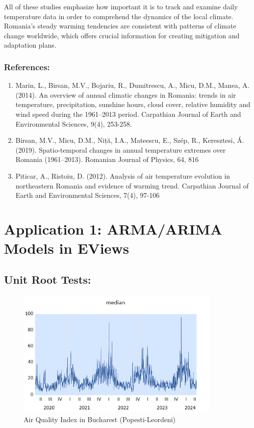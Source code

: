 \documentclass{article} %
\begin{document}
All of these studies emphasize how important it is to track and examine daily temperature data in order to comprehend the dynamics of the local climate. Romania's steady warming tendencies are consistent with patterns of climate change worldwide, which offers crucial information for creating mitigation and adaptation plans.

\subsubsection*{References:}
\begin{enumerate}
    \item Marin, L., Birsan, M.V., Bojariu, R., Dumitrescu, A., Micu, D.M., Manea, A. (2014). An overview of annual climatic changes in Romania: trends in air temperature, precipitation, sunshine hours, cloud cover, relative humidity and wind speed during the 1961–2013 period. Carpathian Journal of Earth and Environmental Sciences, 9(4), 253-258.
    \item Birsan, M.V., Micu, D.M., Niță, I.A., Mateescu, E., Szép, R., Keresztesi, Á. (2019). Spatio-temporal changes in annual temperature extremes over Romania (1961–2013). Romanian Journal of Physics, 64, 816
    \item Piticar, A., Ristoiu, D. (2012). Analysis of air temperature evolution in northeastern Romania and evidence of warming trend. Carpathian Journal of Earth and Environmental Sciences, 7(4), 97-106
\end{enumerate}

\section{Application 1: ARMA/ARIMA Models in EViews}
\subsection{Unit Root Tests:}

\begin{figure}[H]
    \centering
    \includegraphics[width=10cm]{images/image10.png}
    \caption{Air Quality Index in Bucharest (Popesti-Leordeni)}
\end{figure}
\end{document}
